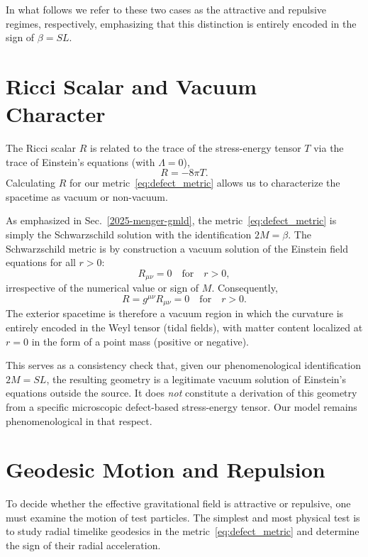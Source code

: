 \documentclass[%
  reprint,
  superscriptaddress,
  showpacs,
  showkeys,
  amsmath,amssymb,
  pra,
  longbibliography,
  floatfix,
  x11names
]{revtex4-2}
\begin{document}
In what follows we refer to these two cases as the attractive and repulsive regimes, respectively, emphasizing that this distinction is entirely encoded in the sign of \(\beta = SL\).

\section{Ricci Scalar and Vacuum Character}
\label{sec:ricci}

The Ricci scalar \(R\) is related to the trace of the stress-energy tensor \(T\) via the trace of Einstein's equations (with \(\Lambda=0\)),
\begin{equation}
R = -8\pi T.
\end{equation}
Calculating \(R\) for our metric~\eqref{eq:defect_metric} allows us to characterize the spacetime as vacuum or non-vacuum.

As emphasized in Sec.~\ref{2025-menger-gmld}, the metric~\eqref{eq:defect_metric} is simply the Schwarzschild solution with the identification \(2M=\beta\). The Schwarzschild metric is by construction a vacuum solution of the Einstein field equations for all \(r>0\):
\begin{equation}
R_{\mu\nu} = 0 \quad \text{for} \quad r>0,
\end{equation}
irrespective of the numerical value or sign of \(M\). Consequently,
\begin{equation}
R = g^{\mu\nu} R_{\mu\nu} = 0 \quad \text{for} \quad r>0.
\end{equation}
The exterior spacetime is therefore a vacuum region in which the curvature is entirely encoded in the Weyl tensor (tidal fields), with matter content localized at \(r=0\) in the form of a point mass (positive or negative).

This serves as a consistency check that, given our phenomenological identification \(2M = SL\), the resulting geometry is a legitimate vacuum solution of Einstein's equations outside the source. It does \emph{not} constitute a derivation of this geometry from a specific microscopic defect-based stress-energy tensor. Our model remains phenomenological in that respect.

\section{Geodesic Motion and Repulsion}
\label{sec:geodesic}

To decide whether the effective gravitational field is attractive or repulsive, one must examine the motion of test particles. The simplest and most physical test is to study radial timelike geodesics in the metric~\eqref{eq:defect_metric} and determine the sign of their radial acceleration.
\end{document}
